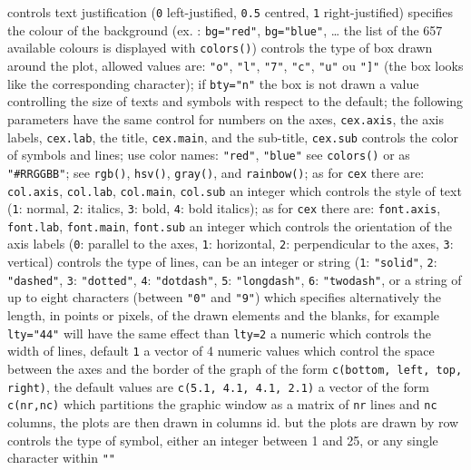 	{controls text justification ({\tt 0} left-justified, {\tt 0.5} centred, {\tt 1} right-justified)}
	{specifies the colour of the background (ex. : {\tt bg="red"}, {\tt bg="blue"}, \ldots{} the list of the 657 available colours is displayed with {\tt colors()})}
	{controls the type of box drawn around the plot, allowed values are: {\tt "o"}, {\tt "l"}, {\tt "7"}, {\tt "c"}, {\tt "u"} ou {\tt "]"} (the box looks like the corresponding character); if {\tt bty="n"} the box is not drawn}
	{ a value controlling the size of texts and symbols with respect to the default; the following parameters have the same control for numbers on the axes, {\tt cex.axis}, the axis labels, {\tt cex.lab}, the title, {\tt cex.main}, and the sub-title, {\tt cex.sub}}
	{controls the color of symbols and lines; use color names: {\tt "red"}, {\tt "blue"} see {\tt colors()} or as {\tt "\#RRGGBB"}; see {\tt rgb()}, {\tt hsv()}, {\tt gray()}, and {\tt rainbow()}; as for {\tt cex} there are: {\tt col.axis}, {\tt col.lab}, {\tt col.main}, {\tt col.sub}}
	{an integer which controls the style of text ({\tt 1}: normal, {\tt 2}: italics, {\tt 3}: bold, {\tt 4}: bold italics); as for {\tt cex} there are: {\tt font.axis}, {\tt font.lab}, {\tt font.main}, {\tt font.sub}}
	{ an integer which controls the orientation of the axis labels ({\tt 0}: parallel to the axes, {\tt 1}: horizontal, {\tt 2}: perpendicular to the axes, {\tt 3}: vertical)}
	{controls the type of lines, can be an integer or string ({\tt 1}: {\tt "solid"}, {\tt 2}: {\tt "dashed"}, {\tt 3}: {\tt "dotted"}, {\tt 4}: {\tt "dotdash"}, {\tt 5}: {\tt "longdash"}, {\tt 6}: {\tt "twodash"}, or a string of up to eight characters (between {\tt "0"} and {\tt "9"}) which specifies alternatively the length, in points or pixels, of the drawn elements and the blanks, for example {\tt lty="44"} will have the same effect than {\tt lty=2}}
	{ a numeric which controls the width of lines, default {\tt 1}}
	{ a vector of 4 numeric values which control the space between the axes and the border of the graph of the form {\tt c(bottom, left, top, right)}, the default values are {\tt c(5.1, 4.1, 4.1, 2.1)}}
	{a vector of the form {\tt c(nr,nc)} which partitions the graphic window as a matrix of {\tt nr} lines and {\tt nc} columns, the plots are then drawn in columns}
	{ id. but the plots are drawn by row}
	{ controls the type of symbol, either an integer between 1 and 25, or any single character within {\tt ""}}

